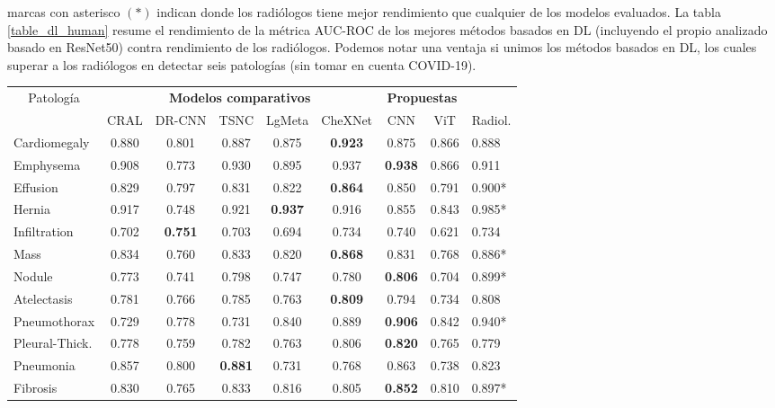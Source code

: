 marcas con asterisco $(*)$ indican donde los radiólogos tiene mejor rendimiento que cualquier de los
modelos evaluados. La tabla \ref{table_dl_human} resume el rendimiento de la métrica AUC-ROC de los
mejores métodos basados en DL (incluyendo el propio analizado basado en ResNet50) contra rendimiento
de los radiólogos. Podemos notar una ventaja si unimos los métodos basados en DL, los cuales superar
a los radiólogos en detectar seis patologías (sin tomar en cuenta COVID-19).

\begin{table}[tb]
    \centering
    \begin{tabular}{|l||c|c|c|c|c|c|c|l|}
        \hline
        \multicolumn{1}{|c||}{Patología}	&	\multicolumn{5}{c|}{\bf Modelos comparativos}    &\multicolumn{2}{c|}{\bf Propuestas} & 	\\
        \cline{2-9}
                        &	CRAL	&	DR-CNN	&	TSNC	& LgMeta & CheXNet	& CNN	    & ViT & 	Radiol.	\\
        \hline\hline
        Cardiomegaly	&	0.880	&	0.801	&	0.887	&	0.875	&\bf{0.923}	&	0.875	& 0.866 &	0.888	\\
        Emphysema	    &	0.908	&	0.773	&	0.930	&	0.895	&	0.937	&\bf{0.938}	& 0.866 &   0.911	\\
        Effusion	    &	0.829	&	0.797	&	0.831	&	0.822	&\bf{0.864}	&	0.850	& 0.791 &   0.900*	\\
        Hernia	        &	0.917	&	0.748	&	0.921	&\bf{0.937}	&	0.916	&	0.855	& 0.843 &   0.985*	\\
        Infiltration	&	0.702	&\bf{0.751}	&	0.703	&	0.694	&	0.734	&	0.740	& 0.621 &	0.734	\\
        Mass	        &	0.834	&	0.760	&	0.833	&	0.820	&\bf{0.868}	&	0.831	& 0.768 &	0.886*	\\
        Nodule	        &	0.773	&	0.741	&	0.798	&	0.747	&	0.780	&\bf{0.806}	& 0.704 &	0.899*	\\
        Atelectasis	    &	0.781	&	0.766	&	0.785	&	0.763	&\bf{0.809}	&	0.794	& 0.734 &	0.808	\\
        Pneumothorax	&	0.729	&	0.778	&	0.731	&	0.840	&	0.889	&\bf{0.906}	& 0.842 &	0.940*	\\
        Pleural-Thick.	&	0.778	&	0.759	&	0.782	&	0.763	&	0.806	&\bf{0.820}	& 0.765 &	0.779	\\
        Pneumonia	    &	0.857	&	0.800	&\bf{0.881}	&	0.731	&	0.768	&	0.863	& 0.738 &	0.823	\\
        Fibrosis	    &	0.830	&	0.765	&	0.833	&	0.816	&	0.805	&\bf{0.852}	& 0.810 &	0.897*	\\

\end{tabular}
\end{table}
